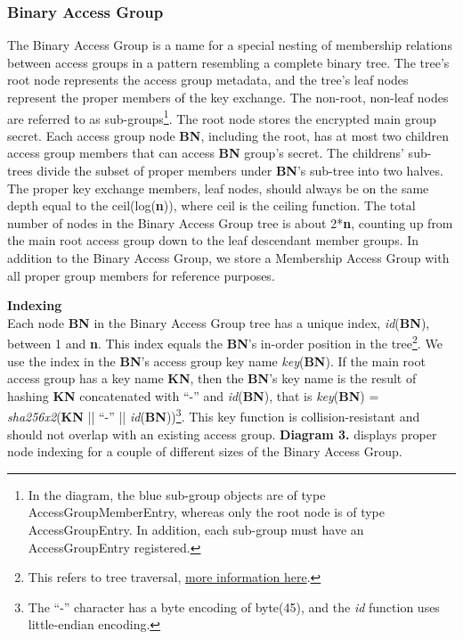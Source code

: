 \documentclass[oneside, 12pt]{article}
\newcommand{\fn}[1]{\footnote{\hangpara{1.4em}{1} #1}}
\begin{document}
\subsubsection{Binary Access Group}
The Binary Access Group is a name for a special nesting of membership relations between access groups in a pattern resembling a complete binary tree. The tree's root node represents the access group metadata, and the tree's leaf nodes represent the proper members of the key exchange. The non-root, non-leaf nodes are referred to as sub-groups\fn{In the diagram, the blue sub-group objects are of type AccessGroupMemberEntry, whereas only the root node is of type AccessGroupEntry. In addition, each sub-group must have an AccessGroupEntry registered.}. The root node stores the encrypted main group secret. Each access group node \textbf{BN}, including the root, has at most two children access group members that can access \textbf{BN} group’s secret. The childrens’ sub-trees divide the subset of proper members under \textbf{BN}’s sub-tree into two halves. The proper key exchange members, leaf nodes, should always be on the same depth equal to the ceil(log(\textbf{n})), where ceil is the ceiling function. The total number of nodes in the Binary Access Group tree is about 2*\textbf{n}, counting up from the main root access group down to the leaf descendant member groups. In addition to the Binary Access Group, we store a Membership Access Group with all proper group members for reference purposes.\newpage

\noindent\textbf{Indexing}\\
\noindent Each node \textbf{BN} in the Binary Access Group tree has a unique index, \textit{id}(\textbf{BN}), between 1 and \textbf{n}. This index equals the \textbf{BN}’s in-order position in the tree\fn{This refers to tree traversal, \href{https://en.wikipedia.org/wiki/Tree_traversal}{more information here}.}. We use the index in the \textbf{BN}’s access group key name \textit{key}(\textbf{BN}). If the main root access group has a key name \textbf{KN}, then the \textbf{BN}’s key name is the result of hashing \textbf{KN} concatenated with “-” and \textit{id}(\textbf{BN}), that is \textit{key}(\textbf{BN}) = \textit{sha256x2}(\textbf{KN} || “-” || \textit{id}(\textbf{BN}))\fn{The “-” character has a byte encoding of byte(45), and the \textit{id} function uses little-endian encoding.}. This key function is collision-resistant and should not overlap with an existing access group. \textbf{Diagram 3.} displays proper node indexing for a couple of different sizes of the Binary Access Group.\\
\end{document}
